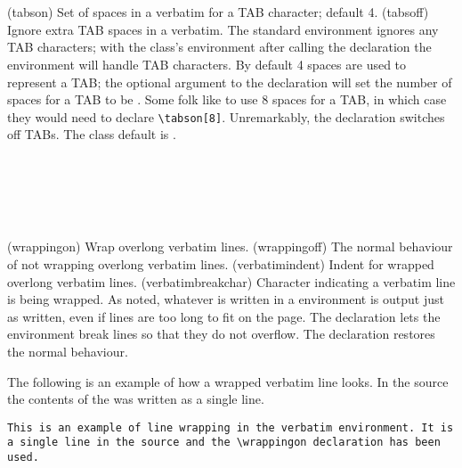 {{{{\begin{syntax}
\cmd{\tabson} \\
\cmd{\tabsoff} \\
\end{syntax}
\glossary(tabson)%
  {}%
  {Set  of spaces in a verbatim for a TAB character;
   default 4.}
\glossary(tabsoff)%
  {}%
  {Ignore extra TAB spaces in a verbatim.} 
The standard  environment ignores any TAB characters; with
the class's environment after calling the \cmd{\tabson} declaration 
the environment will handle TAB characters. By default 4 spaces are used
to represent a TAB; the optional  argument to the declaration
will set the number of spaces for a TAB to be .
Some folk like to use 8 spaces for a TAB, in which case they would need
to declare \verb?\tabson[8]?. Unremarkably, the declaration \cmd{\tabsoff}
switches off TABs. The class default is \cmd{\tabsoff}.

\begin{syntax}
\cmd{\wrappingon} \\
\cmd{\wrappingoff} \\
\lnc{\verbatimindent} \\
\cmd{\verbatimbreakchar} \\
\end{syntax}
\glossary(wrappingon)%
  {}%
  {Wrap overlong verbatim lines.}
\glossary(wrappingoff)%
  {}%
  {The normal behaviour of not wrapping overlong verbatim lines.}
\glossary(verbatimindent)%
  {}%
  {Indent for wrapped overlong verbatim lines.}
\glossary(verbatimbreakchar)%
  {}%
  {Character indicating a verbatim line is being wrapped.}
As noted, whatever is written in a  environment is output
just as written, even if lines are too long 
to fit on the page. The
declaration \cmd{\wrappingon} lets the environment break lines so that they
do not overflow. The declaration \cmd{\wrappingoff} restores the normal
behaviour.

    The following is an example of how a wrapped verbatim line looks. In
the source the contents of the  was written as a single line.
\wrappingon
\begin{verbatim}
This is an example of line wrapping in the verbatim environment. It is a single line in the source and the \wrappingon declaration has been used.
\end{verbatim}
\wrappingoff

}}}}
